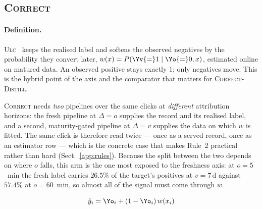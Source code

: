 \subsection{\textsc{Correct}}\label{app:m-ULC-aux5e4}

\paragraph{Definition.} \textsc{Ulc}~\cite{wang2023unbiased} keeps the realised label and softens the observed
   negatives by the probability they convert later, $w(x)=P(\Yv{=}1\mid\Yo{=}0,x)$, estimated
   online on matured data. An observed positive stays exactly $1$; only negatives move. This is
   the hybrid point of the axis and the comparator that matters for \textsc{Correct-Distill}.

   \textsc{Correct} needs \emph{two} pipelines over the same clicks at \emph{different}
   attribution horizons: the fresh pipeline at $\Delta=o$ supplies the record and its realised
   label, and a second, maturity-gated pipeline at $\Delta=v$ supplies the data on which $w$ is
   fitted. The same click is therefore read twice --- once as a served record, once as an
   estimator row --- which is the concrete case that makes Rule~2 practical rather than hard
   (Sect.~\ref{app:rules}). Because the split between the two depends on where $o$ falls, this
   arm is the one most exposed to the freshness axis: at $o=5$~min the fresh label carries
   $26.5\%$ of the target's positives at $v=7$\,d against $57.4\%$ at $o=60$~min, so almost all
   of the signal must come through $w$.

\begin{equation}
\tilde y_i = \Yo_i + (1-\Yo_i)\,w(x_i)
\end{equation}

\begin{center}\end{center}

